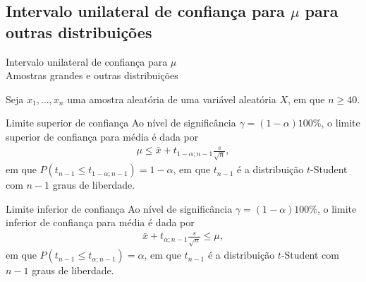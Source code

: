 \documentclass[8pt]{beamer}
\begin{document}
\subsection{Intervalo unilateral de confiança para $\mu$ para outras distribuições}

\begin{frame}{Intervalo unilateral de confiança para $\mu$\\ Amostras grandes e outras distribuições}

\normalsize

Seja $x_1, \dots, x_n$ uma amostra aleatória de uma variável aleatória $X$, em que $n \geq 40$.

\begin{block}{Limite superior de confiança}
	Ao nível de significância $\gamma=(1-\alpha)100\%$, o limite superior de confiança para média é dada por
	\begin{align*}
	\mu \leq \bar{x} + t_{1-\alpha;n-1} \frac{s}{\sqrt{n}},
	\end{align*}
	em que $P(t_{n-1} \leq t_{1-\alpha;n-1}) = 1 - \alpha$, em que $t_{n-1}$ é a distribuição $t$-Student com $n-1$ graus de liberdade.
	
\end{block}

\begin{block}{Limite inferior de confiança}
	Ao nível de significância $\gamma=(1-\alpha)100\%$, o limite inferior de confiança para média é dada por
	\begin{align*}
	\bar{x} + t_{\alpha;n-1} \frac{s}{\sqrt{n}} \leq \mu,
	\end{align*}
	em que $P(t_{n-1} \leq t_{\alpha;n-1}) = \alpha$, em que $t_{n-1}$ é a distribuição $t$-Student com $n-1$ graus de liberdade.
\end{block}

\normalsize

\end{frame}
\end{document}
